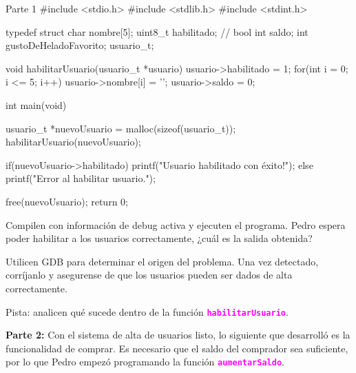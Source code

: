 \documentclass[]{scrartcl}
\newcommand{\hl}[1]{\textcolor{magenta}{\textbf{\texttt{#1}}}}
\begin{document}
\begin{cbox}[]{Parte 1}
  #include <stdio.h>
  #include <stdlib.h>
  #include <stdint.h>

  typedef struct{
      char nombre[5];
      uint8_t habilitado; // bool
      int saldo;
      int gustoDeHeladoFavorito;
  } usuario_t;

  void habilitarUsuario(usuario_t *usuario){
      usuario->habilitado = 1;
      for(int i = 0; i <= 5; i++){
          usuario->nombre[i] = '\0';
      }
      usuario->saldo = 0;
  }

  int main(void){
      usuario_t *nuevoUsuario = malloc(sizeof(usuario_t));
      habilitarUsuario(nuevoUsuario);

      if(nuevoUsuario->habilitado){
          printf("Usuario habilitado con éxito!\n");
      } else{
          printf("Error al habilitar usuario.\n");
      }
    
      free(nuevoUsuario);
      return 0;
  }
\end{cbox}

Compilen con información de debug activa y ejecuten el programa. Pedro espera poder habilitar a los usuarios correctamente, ¿cuál es la salida obtenida?

Utilicen GDB para determinar el origen del problema. Una vez detectado, corríjanlo y asegurense de que los usuarios pueden ser dados de alta correctamente.

Pista: analicen qué sucede dentro de la función \hl{habilitarUsuario}.

\textbf{Parte 2:}
Con el sistema de alta de usuarios listo, lo siguiente que desarrolló es la funcionalidad de comprar. 
Es necesario que el saldo del comprador sea suficiente, por lo que Pedro empezó programando la función \hl{aumentarSaldo}.
\end{document}
